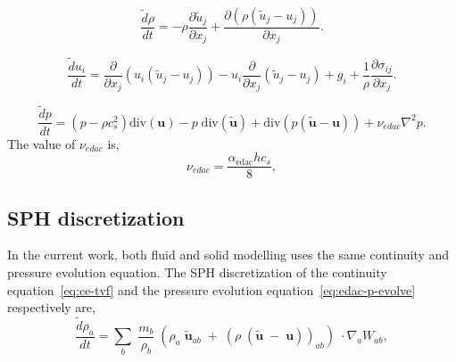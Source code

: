 \documentclass[preprint,12pt]{elsarticle}
\newcommand{\ten}[1]{\ensuremath{\mathbf{#1}}}
\begin{document}
\begin{equation}
  \label{eq:ce-tvf}
  \frac{\tilde{d} \rho}{d t} =
  - \rho \frac{\partial \tilde{u}_j}{\partial x_j} +
  \frac{\partial (\rho (\tilde{u}_j - u_j))}{\partial x_j}.
\end{equation}

\begin{equation}
  \label{eq:mom-tvf}
  \frac{\tilde{d} u_i}{d t} =
  \frac{\partial}{\partial x_j} (u_i (\tilde{u}_j - u_j))
  - u_i \frac{\partial}{\partial x_j} (\tilde{u}_j - u_j)
  + g_i
  +\frac{1}{\rho} \frac{\partial \sigma_{ij}}{\partial x_j}.
\end{equation}


\begin{equation}
  \label{eq:edac-p-evolve}
  \frac{\tilde{d} p}{d t} =
  (p -\rho c_s^2)
    \text{div}(\ten{u})
  - p \; \text{div}(\tilde{\ten{u}})
    + \text{div}(p (\tilde{\ten{u}} - \ten{u}))
    + \nu_{edac}  \nabla^2 p.
\end{equation}
%
The value of $\nu_{edac}$ is,
\begin{equation}
  \label{eq:nu-edac}
  \nu_{edac} = \frac{\alpha_{\textrm{edac}} h c_s}{8},
\end{equation}


\subsection{SPH discretization}

In the current work, both fluid and solid modelling uses the same continuity
and pressure evolution equation. The SPH discretization of the continuity
equation~\eqref{eq:ce-tvf} and the pressure evolution
equation~\eqref{eq:edac-p-evolve} respectively are,
\begin{equation}
  \label{eq:sph-discretization-continuity}
  \frac{\tilde{d}\rho_a}{dt} = \sum_{b} \; \frac{m_b}{\rho_{b}} \; (
  \rho_{a} \; \tilde{\ten{u}}_{ab} \; + \;
  (\rho \; (\tilde{\ten{u}} \; - \;
  \ten{u}))_{ab}) \; \cdot \nabla_{a} W_{ab},
\end{equation}
\end{document}
